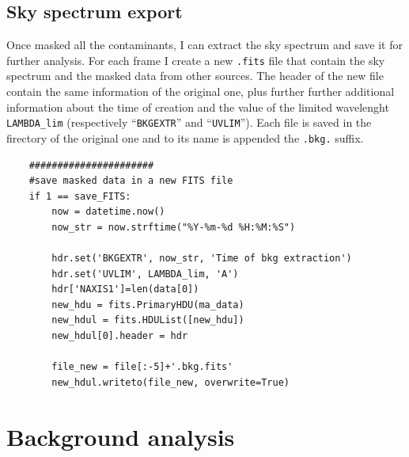 \subsection{Sky spectrum export}
Once masked all the contaminants, I can extract the sky spectrum and save it for further analysis. For each frame I create a new \texttt{.fits} file that contain the sky spectrum and the masked data from other sources. The header of the new file contain the same information of the original one, plus further further additional information about the time of creation and the value of the limited wavelenght \texttt{LAMBDA\_lim} (respectively ``\texttt{BKGEXTR}'' and ``\texttt{UVLIM}''). Each file is saved in the firectory of the original one and to its name is appended the \texttt{.bkg.} suffix.

\begin{lstlisting}
	######################
	#save masked data in a new FITS file
	if 1 == save_FITS:
		now = datetime.now()
		now_str = now.strftime("%Y-%m-%d %H:%M:%S")
	
		hdr.set('BKGEXTR', now_str, 'Time of bkg extraction')
		hdr.set('UVLIM', LAMBDA_lim, 'A')
		hdr['NAXIS1']=len(data[0])
		new_hdu = fits.PrimaryHDU(ma_data)
		new_hdul = fits.HDUList([new_hdu])
		new_hdul[0].header = hdr
	
		file_new = file[:-5]+'.bkg.fits'
		new_hdul.writeto(file_new, overwrite=True)
\end{lstlisting}

\section{Background analysis}

